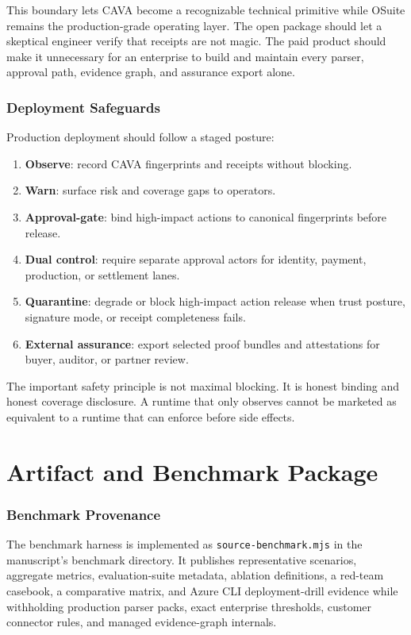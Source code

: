 \documentclass[11pt]{article}
\begin{document}
This boundary lets CAVA become a recognizable technical primitive while OSuite remains the production-grade operating layer. The open package should let a skeptical engineer verify that receipts are not magic. The paid product should make it unnecessary for an enterprise to build and maintain every parser, approval path, evidence graph, and assurance export alone.

\section{Deployment Safeguards}

Production deployment should follow a staged posture:

\begin{enumerate}
  \item \textbf{Observe}: record CAVA fingerprints and receipts without blocking.
  \item \textbf{Warn}: surface risk and coverage gaps to operators.
  \item \textbf{Approval-gate}: bind high-impact actions to canonical fingerprints before release.
  \item \textbf{Dual control}: require separate approval actors for identity, payment, production, or settlement lanes.
  \item \textbf{Quarantine}: degrade or block high-impact action release when trust posture, signature mode, or receipt completeness fails.
  \item \textbf{External assurance}: export selected proof bundles and attestations for buyer, auditor, or partner review.
\end{enumerate}

The important safety principle is not maximal blocking. It is honest binding and honest coverage disclosure. A runtime that only observes cannot be marketed as equivalent to a runtime that can enforce before side effects.

\part{Artifact and Benchmark Package}

\section{Benchmark Provenance}

The benchmark harness is implemented as \texttt{source-benchmark.mjs} in the manuscript's benchmark directory. It publishes representative scenarios, aggregate metrics, evaluation-suite metadata, ablation definitions, a red-team casebook, a comparative matrix, and Azure CLI deployment-drill evidence while withholding production parser packs, exact enterprise thresholds, customer connector rules, and managed evidence-graph internals.
\end{document}
